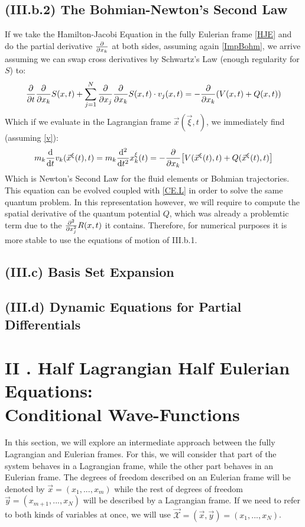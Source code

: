 \documentclass[11pt, a4paper]{article} %
\newcommand{\x}{\mathcal{X}}
\begin{document}
\subsection*{(III.b.2) The Bohmian-Newton's Second Law}

If we take the Hamilton-Jacobi Equation in the fully Eulerian frame \eqref{HJE} and do the partial derivative $\pdv{}{x_k}$ at both sides, assuming again \eqref{ImpBohm}, we arrive assuming we can swap cross derivatives by Schwartz's Law (enough regularity for $S$) to:
\begin{equation}
\pdv{}{t}\pdv{}{x_k}S(x,t)+\sum_{j=1}^N\pdv{}{x_j}\pdv{}{x_k}S(x,t)\cdot v_j(x,t)=-\pdv{}{x_k}\qty(V(x,t)+Q(x,t))
\end{equation}
Which if we evaluate in the Lagrangian frame $\vec{x}(\vec{\xi},t)$, we immediately find (assuming \eqref{v}):
\begin{equation}
m_k\dv{}{t}v_k(\vec{x}^\xi(t),t)=m_k\dv[2]{}{t}x^\xi_k(t)=-\pdv{}{x_k}\qty[V(\vec{x}^\xi(t),t)+Q(\vec{x}^\xi(t),t) ]
\end{equation}
Which is Newton's Second Law for the fluid elements or Bohmian trajectories. This equation can be evolved coupled with \eqref{CE.L} in order to solve the same quantum problem. In this representation however, we will require to compute the spatial derivative of the quantum potential $Q$, which was already a problemtic term due to the $\pdv[2]{}{x_j}R(x,t)$ it contains. Therefore, for numerical purposes it is more stable to use the equations of motion of III.b.1.


\subsection*{(III.c) Basis Set Expansion}
\subsection*{(III.d) Dynamic Equations for Partial Differentials}

\section*{II . Half Lagrangian Half Eulerian Equations:\\ Conditional Wave-Functions}
In this section, we will explore an intermediate approach between the fully Lagrangian and Eulerian frames. For this, we will consider that part of the system behaves in a Lagrangian frame, while the other part behaves in an Eulerian frame. The degrees of freedom described on an Eulerian frame will be denoted by $\vec{x}=(x_1,...,x_m)$ while the rest of degrees of freedom $\vec{y}=(x_{m+1},...,x_N)$ will be described by a Lagrangian frame. If we need to refer to both kinds of variables at once, we will use $\vec{\x}=(\vec{x}, \vec{y})=(x_1,...,x_N)$.
\end{document}
